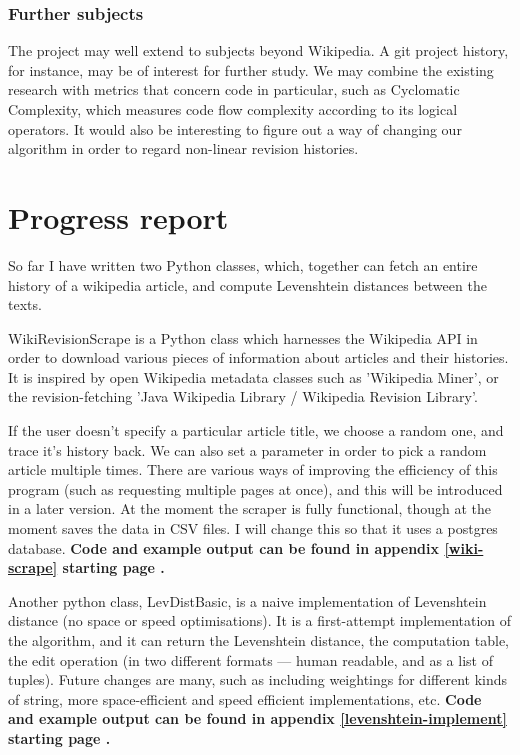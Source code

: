 \documentclass[a4paper,11pt,twoside,notitlepage]{article}
\begin{document}
        \subsubsection*{Further subjects}
        The project may well extend to subjects beyond Wikipedia. A
        git project history, for instance, may be of interest for
        further study. We may combine the existing research with
        metrics that concern code in particular,
        such as Cyclomatic Complexity, which measures code flow
        complexity according to its logical
        operators.\cite{McCabe1976} It would also be interesting to
        figure out a way of changing our algorithm in order to regard
        non-linear revision histories.

        \section{Progress report}
        So far I have written two Python classes, which, together
        can fetch an entire history of a wikipedia article, and
        compute Levenshtein distances between the texts.

        WikiRevisionScrape is a Python class which harnesses the
        Wikipedia API in order to download various pieces of
        information about articles and their histories. It is inspired
        by open Wikipedia metadata classes such as 'Wikipedia
        Miner'\cite{wiki-miner}, or the revision-fetching 'Java
        Wikipedia Library / Wikipedia Revision
        Library'.\cite{wiki-java}\cite{Ferschke2011}

        If the user doesn't specify a particular article title, we
        choose a random one, and trace it's history back. We can also
        set a parameter in order to pick a random article multiple
        times. There are various ways of improving the efficiency of
        this program (such as requesting multiple pages at once), and
        this will be introduced in a later version. At the moment the
        scraper is fully functional, though at the moment saves the data
        in CSV files. I will change this so that it uses a postgres
        database. \textbf{Code and example output can be found in appendix
        \ref{wiki-scrape} starting page \pageref{wiki-scrape}.}

        Another python class, LevDistBasic, is a naive implementation
        of Levenshtein distance (no space or speed
        optimisations). It is a first-attempt implementation of the
        algorithm, and it can return the Levenshtein distance, the
        computation table, the edit operation (in two different
        formats --- human readable, and as a list of tuples). Future
        changes are many, such as including weightings for different
        kinds of string, more space-efficient and speed efficient
        implementations, etc. \textbf{Code and example output can be found in
        appendix \ref{levenshtein-implement} starting page
        \pageref{levenshtein-implement}.}
\end{document}
